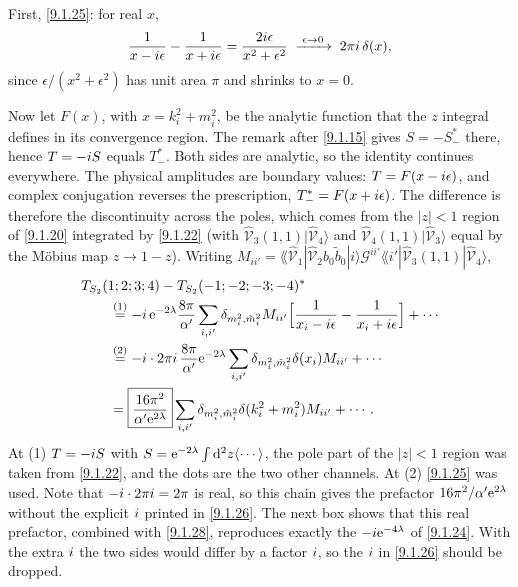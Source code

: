 \begin{tcolorbox}[breakable]
	\begin{remark}
		First, \eqref{9.1.25}: for real $x$,
		\begin{equation*}
			\frac{1}{x-i\epsilon}-\frac{1}{x+i\epsilon}=\frac{2i\epsilon}{x^2+\epsilon^2}\;\xrightarrow{\;\epsilon\to0\;}\;2\pi i\,\delta(x),
		\end{equation*}
		since $\epsilon/(x^2+\epsilon^2)$ has unit area $\pi$ and shrinks to $x=0$.

		Now let $F(x)$, with $x=k_i^2+m_i^2$, be the analytic function that the $z$ integral defines in its convergence region. The remark after \eqref{9.1.15} gives $S=-S_{-}^{*}$ there, hence $T=-i S$ equals $T_{-}^{*}$. Both sides are analytic, so the identity continues everywhere. The physical amplitudes are boundary values: $T=F(x-i\epsilon)$, and complex conjugation reverses the prescription, $T_{-}^{*}=F(x+i\epsilon)$. The difference is therefore the discontinuity across the poles, which comes from the $|z|<1$ region of \eqref{9.1.20} integrated by \eqref{9.1.22} (with $\hat{\mathscr V}_{3}(1,1)|\hat{\mathscr V}_4\rangle$ and $\hat{\mathscr V}_4(1,1)|\hat{\mathscr V}_3\rangle$ equal by the M\"obius map $z\to1-z$). Writing $M_{ii'}=\lAngle\hat{\mathscr V}_1|\hat{\mathscr V}_2 b_0\tilde b_0|i\rangle\mathscr G^{ii'}\lAngle i'|\hat{\mathscr V}_3(1,1)|\hat{\mathscr V}_4\rangle$,
		\begin{align*}
			&T_{S_2}(1;2;3;4)-T_{S_2}(-1;-2;-3;-4)^{*}\\
			&\qquad\overset{(1)}{=} -i\,\mathrm{e}^{-2\lambda}\frac{8\pi}{\alpha'}\sum_{i,i'}\delta_{m_i^2,\tilde m_i^2}M_{ii'}\Bigl[\frac{1}{x_i-i\epsilon}-\frac{1}{x_i+i\epsilon}\Bigr]+\cdots\\
			&\qquad\overset{(2)}{=} -i\cdot2\pi i\,\frac{8\pi}{\alpha'}\mathrm{e}^{-2\lambda}\sum_{i,i'}\delta_{m_i^2,\tilde m_i^2}\delta(x_i)M_{ii'}+\cdots\\
			&\qquad=\boxed{\frac{16\pi^2}{\alpha'\mathrm{e}^{2\lambda}}}\sum_{i,i'}\delta_{m_i^2,\tilde m_i^2}\delta(k_i^2+m_i^2)M_{ii'}+\cdots .
		\end{align*}
		At (1) $T=-i S$ with $S=\mathrm{e}^{-2\lambda}\int\mathrm{d}^2z\langle\cdots\rangle$, the pole part of the $|z|<1$ region was taken from \eqref{9.1.22}, and the dots are the two other channels. At (2) \eqref{9.1.25} was used. Note that $-i\cdot2\pi i=2\pi$ is real, so this chain gives the prefactor $16\pi^2/\alpha'\mathrm{e}^{2\lambda}$ without the explicit $i$ printed in \eqref{9.1.26}. The next box shows that this real prefactor, combined with \eqref{9.1.28}, reproduces exactly the $-i\mathrm{e}^{-4\lambda}$ of \eqref{9.1.24}. With the extra $i$ the two sides would differ by a factor $i$, so the $i$ in \eqref{9.1.26} should be dropped.
	\end{remark}
\end{tcolorbox}
